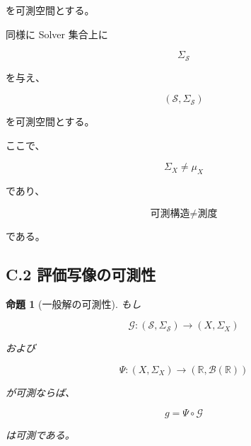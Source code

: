 \documentclass[a4paper,11pt]{article}
\newtheorem{proposition}[definition]{命題}
\newcommand{\Solver}{\mathcal{S}}
\newcommand{\R}{\mathbb{R}}
\newcommand{\Eval}{\mathcal{G}}
\newcommand{\EvalMap}{\Psi}
\begin{document}
を可測空間とする。

同様に Solver 集合上に

\begin{equation}
    \Sigma_{\Solver}
\end{equation}

を与え、

\begin{equation}
    (\Solver,\Sigma_{\Solver})
\end{equation}

を可測空間とする。

ここで、

\begin{equation}
    \Sigma_X
    \neq
    \mu_X
\end{equation}

であり、

\begin{equation}
    \text{可測構造}
    \neq
    \text{測度}
\end{equation}

である。


\subsection{C.2 評価写像の可測性}

\begin{proposition}[一般解の可測性]
もし

\begin{equation}
    \Eval:
    (\Solver,\Sigma_{\Solver})
    \longrightarrow
    (X,\Sigma_X)
\end{equation}

および

\begin{equation}
    \EvalMap:
    (X,\Sigma_X)
    \longrightarrow
    (\R,\mathcal{B}(\R))
\end{equation}

が可測ならば、

\begin{equation}
    g=\EvalMap\circ\Eval
\end{equation}

は可測である。
\end{proposition}
\end{document}
